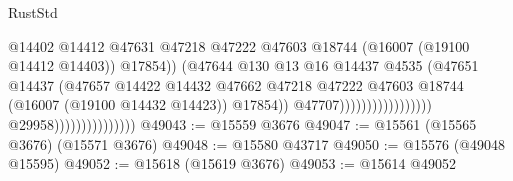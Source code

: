 \begin{lexlean}{RustStd}
\begin{coremodule}
                                                                      @14402
                                                                      @14412
                                                                      @47631
                                                                      @47218
                                                                      @47222
                                                                      @47603
                                                                      @18744
                                                                      (@16007
                                                                        (@19100 @14412 @14403))
                                                                      @17854))
                                                                  (@47644
                                                                    @130
                                                                    @13
                                                                    @16
                                                                    @14437
                                                                    @4535
                                                                    (@47651
                                                                      @14437
                                                                      (@47657
                                                                        @14422
                                                                        @14432
                                                                        @47662
                                                                        @47218
                                                                        @47222
                                                                        @47603
                                                                        @18744
                                                                        (@16007
                                                                          (@19100 @14432 @14423))
                                                                        @17854))
                                                                    @47707)))))))))))))))))
                                  @29958)))))))))))))))
@49043 := @15559 @3676
@49047 := @15561 (@15565 @3676) (@15571 @3676)
@49048 := @15580 @43717
@49050 := @15576 (@49048 @15595)
@49052 := @15618 (@15619 @3676)
@49053 := @15614 @49052

\end{coremodule}
\end{lexlean}
